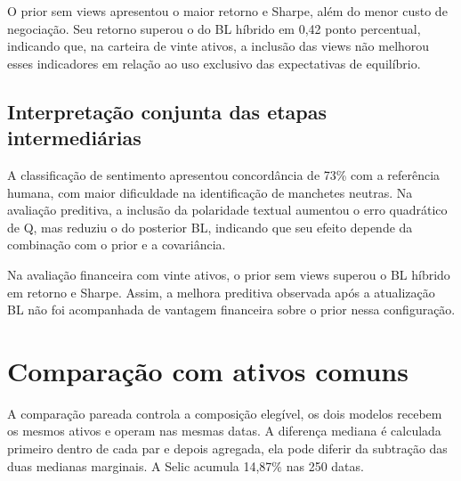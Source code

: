 O prior sem views apresentou o maior retorno e Sharpe,
além do menor custo de negociação. Seu retorno superou
o do BL híbrido em 0,42 ponto percentual, indicando que,
na carteira de vinte ativos, a inclusão das views não
melhorou esses indicadores em relação ao uso exclusivo
das expectativas de equilíbrio.

\subsection*{Interpretação conjunta das etapas intermediárias}

A classificação de sentimento apresentou concordância de
73\% com a referência humana, com maior dificuldade na
identificação de manchetes neutras. Na avaliação preditiva,
a inclusão da polaridade textual aumentou o erro quadrático
de Q, mas reduziu o do posterior BL, indicando que seu efeito
depende da combinação com o prior e a covariância.

Na avaliação financeira com vinte ativos, o prior sem views
superou o BL híbrido em retorno e Sharpe. Assim, a melhora
preditiva observada após a atualização BL não foi acompanhada
de vantagem financeira sobre o prior nessa configuração.

\section{Comparação com ativos comuns}
A comparação pareada controla a composição elegível, os dois modelos recebem os mesmos ativos e operam nas mesmas datas. A diferença mediana é calculada primeiro dentro de cada par e depois agregada, ela pode diferir da subtração das duas medianas marginais. A Selic acumula 14,87\% nas 250 datas.

